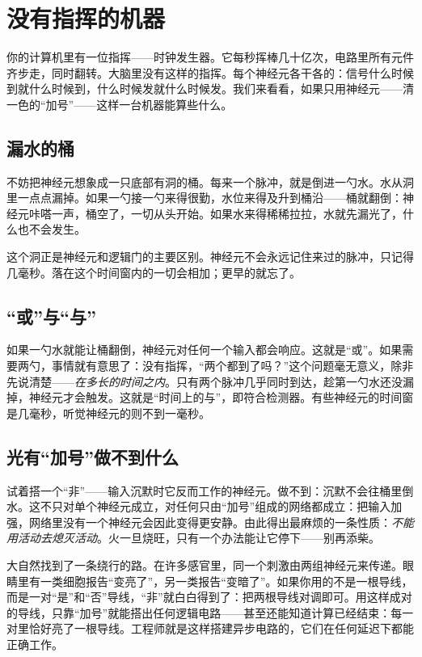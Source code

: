 \chapter{没有指挥的机器}

你的计算机里有一位指挥——时钟发生器。它每秒挥棒几十亿次，电路里所有元件齐步走，同时翻转。大脑里没有这样的指挥。每个神经元各干各的：信号什么时候到就什么时候到，什么时候发就什么时候发。我们来看看，如果只用神经元——清一色的“加号”——这样一台机器能算些什么。

\section*{漏水的桶}

不妨把神经元想象成一只底部有洞的桶。每来一个脉冲，就是倒进一勺水。水从洞里一点点漏掉。如果一勺接一勺来得很勤，水位来得及升到桶沿——桶就翻倒：神经元咔嗒一声，桶空了，一切从头开始。如果水来得稀稀拉拉，水就先漏光了，什么也不会发生。


这个洞正是神经元和逻辑门的主要区别。神经元不会永远记住来过的脉冲，只记得几毫秒。落在这个时间窗内的一切会相加；更早的就忘了。

\section*{“或”与“与”}

如果一勺水就能让桶翻倒，神经元对任何一个输入都会响应。这就是“或”。如果需要两勺，事情就有意思了：没有指挥，“两个都到了吗？”这个问题毫无意义，除非先说清楚——\emph{在多长的时间之内}。只有两个脉冲几乎同时到达，趁第一勺水还没漏掉，神经元才会触发。这就是“时间上的与”，即符合检测器。有些神经元的时间窗是几毫秒，听觉神经元的则不到一毫秒。

\section*{光有“加号”做不到什么}

试着搭一个“非”——输入沉默时它反而工作的神经元。做不到：沉默不会往桶里倒水。这不只对单个神经元成立，对任何只由“加号”组成的网络都成立：把输入加强，网络里没有一个神经元会因此变得更安静。由此得出最麻烦的一条性质：\emph{不能用活动去熄灭活动}。火一旦烧旺，只有一个办法能让它停下——别再添柴。

大自然找到了一条绕行的路。在许多感官里，同一个刺激由两组神经元来传递。眼睛里有一类细胞报告“变亮了”，另一类报告“变暗了”。如果你用的不是一根导线，而是一对“是”和“否”导线，“非”就白白得到了：把两根导线对调即可。用这样成对的导线，只靠“加号”就能搭出任何逻辑电路——甚至还能知道计算已经结束：每一对里恰好亮了一根导线。工程师就是这样搭建异步电路的，它们在任何延迟下都能正确工作。

